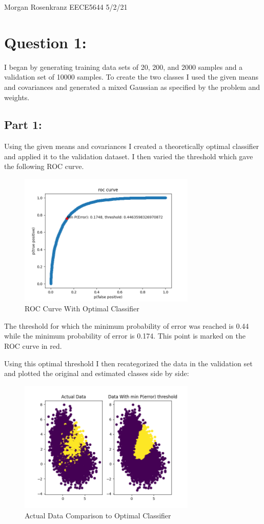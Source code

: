 \documentclass[11pt]{article}
\begin{document}
Morgan Rosenkranz 
EECE5644 
5/2/21 

\section*{Question 1:}
I began by generating training data sets of 20, 200, and 2000 samples and a validation set of 10000 samples.
To create the two classes I used the given means and covariances and generated a mixed Gaussian as specified by the problem and weights.

\subsection*{Part 1:}
Using the given means and covariances I created a theoretically optimal classifier and applied it to the validation dataset.
I then varied the threshold which gave the following ROC curve.

\begin{figure}[H]
	\centering
	\includegraphics[width=0.75\textwidth]{optimal_roc}
	\caption{ROC Curve With Optimal Classifier}
\end{figure}

The threshold for which the minimum probability of error was reached is 0.44 while the minimum probability of error is 0.174.
This point is marked on the ROC curve in red.

Using this optimal threshold I then recategorized the data in the validation set and plotted the original and estimated classes side by side:

\begin{figure}[H]
	\centering
	\includegraphics[width=0.75\textwidth]{optimal_data}
	\caption{Actual Data Comparison to Optimal Classifier}
\end{figure}
\end{document}
